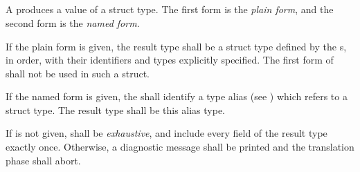 \begin{grammar}
 \\
	 \terminal{\{}  \optional{\terminal{,}} \terminal{\}} \\
	 \terminal{\{}  \optional{\terminal{,}} \terminal{\}} \\

 \\
	 \\
	 \terminal{,}  \\
	 \\

 \\
	 \\
	 \terminal{,}  \\

 \\
	 \terminal{=}  \\
	 \terminal{:}  \terminal{=}  \\
	 \\
\end{grammar}

\specsubsubitem
A  produces a value of a struct type. The first
form is the \textit{plain form}, and the second form is the \textit{named form}.

\specsubsubitem
If the plain form is given, the result type shall be a struct type defined by
the s, in order, with their identifiers and types
explicitly specified. The first form of  shall not be
used in such a struct.

\specsubsubitem
If the named form is given, the  shall identify a type
alias (see ) which refers to a struct type. The result
type shall be this alias type.

\specsubsubitem
If  is not given,  shall be
\textit{exhaustive}, and include every field of the result type exactly once.
Otherwise, a diagnostic message shall be printed and the translation phase
shall abort.

